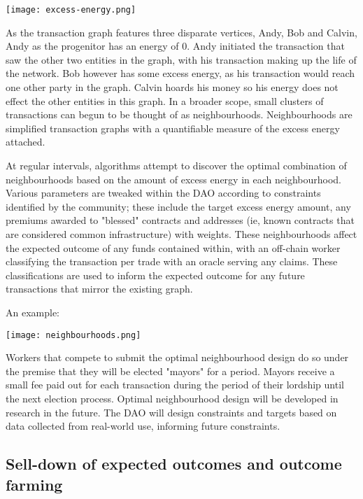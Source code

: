 \begin{center}
    \texttt{[image: excess-energy.png]}
\end{center}

As the transaction graph features three disparate vertices, Andy, Bob and Calvin, Andy as the progenitor has an energy of 0. Andy initiated the transaction that saw the other two entities in the graph, with his transaction making up the life of the network. Bob however has some excess energy, as his transaction would reach one other party in the graph. Calvin hoards his money so his energy does not effect the other entities in this graph. In a broader scope, small clusters of transactions can begun to be thought of as neighbourhoods. Neighbourhoods are simplified transaction graphs with a quantifiable measure of the excess energy attached.

At regular intervals, algorithms attempt to discover the optimal combination of neighbourhoods based on the amount of excess energy in each neighbourhood. Various parameters are tweaked within the DAO according to constraints identified by the community; these include the target excess energy amount, any premiums awarded to "blessed" contracts and addresses (ie, known contracts that are considered common infrastructure) with weights. These neighbourhoods affect the expected outcome of any funds contained within, with an off-chain worker classifying the transaction per trade with an oracle serving any claims. These classifications are used to inform the expected outcome for any future transactions that mirror the existing graph.

An example:

\begin{center}
    \texttt{[image: neighbourhoods.png]}
\end{center}

Workers that compete to submit the optimal neighbourhood design do so under the premise that they will be elected "mayors" for a period. Mayors receive a small fee paid out for each transaction during the period of their lordship until the next election process. Optimal neighbourhood design will be developed in research in the future. The DAO will design constraints and targets based on data collected from real-world use, informing future constraints.

\subsection{Sell-down of expected outcomes and outcome farming}

